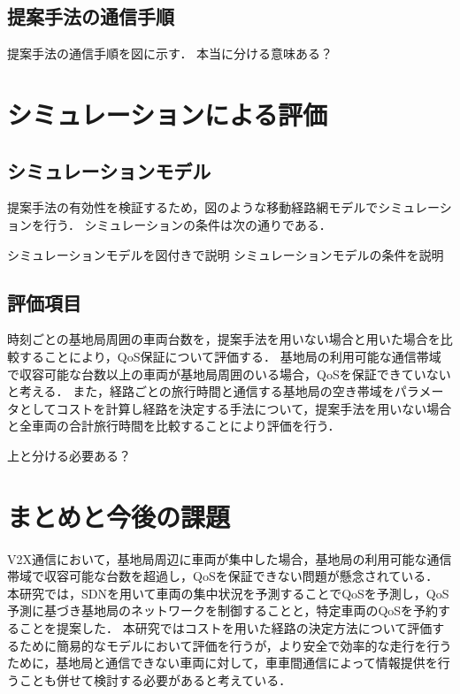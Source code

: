 \documentclass[a4paper,10pt,twocolumn,uplatex]{jsarticle}
\begin{document}
\subsection{提案手法の通信手順}
提案手法の通信手順を図に示す．
本当に分ける意味ある？

\section{シミュレーションによる評価}
\subsection{シミュレーションモデル}
提案手法の有効性を検証するため，図のような移動経路網モデルでシミュレーションを行う．
シミュレーションの条件は次の通りである．

シミュレーションモデルを図付きで説明
シミュレーションモデルの条件を説明

\subsection{評価項目}
時刻ごとの基地局周囲の車両台数を，提案手法を用いない場合と用いた場合を比較することにより，QoS保証について評価する．
基地局の利用可能な通信帯域で収容可能な台数以上の車両が基地局周囲のいる場合，QoSを保証できていないと考える．
また，経路ごとの旅行時間と通信する基地局の空き帯域をパラメータとしてコストを計算し経路を決定する手法について，提案手法を用いない場合と全車両の合計旅行時間を比較することにより評価を行う．

上と分ける必要ある？

\section{まとめと今後の課題}
V2X通信において，基地局周辺に車両が集中した場合，基地局の利用可能な通信帯域で収容可能な台数を超過し，QoSを保証できない問題が懸念されている．
本研究では，SDNを用いて車両の集中状況を予測することでQoSを予測し，QoS予測に基づき基地局のネットワークを制御することと，特定車両のQoSを予約することを提案した．
本研究ではコストを用いた経路の決定方法について評価するために簡易的なモデルにおいて評価を行うが，より安全で効率的な走行を行うために，基地局と通信できない車両に対して，車車間通信によって情報提供を行うことも併せて検討する必要があると考えている．
\end{document}
